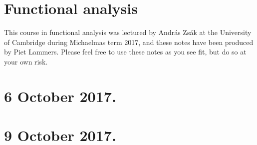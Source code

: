 \documentclass[11pt]{article}
\theoremstyle{definition}
\begin{document}
\section*{\LARGE Functional analysis}

\leftskip=1.5cm\rightskip=1.5cm

This course in functional analysis was lectured by Andr\'as Zs\'ak at the University of Cambridge during Michaelmas term 2017,
and these notes have been produced by Piet Lammers.
Please feel free to use these notes as you see fit, but do so at your own risk.

\leftskip=0cm \rightskip=0cm


\section{6 October 2017.}



\section{9 October 2017.}

\end{document}
